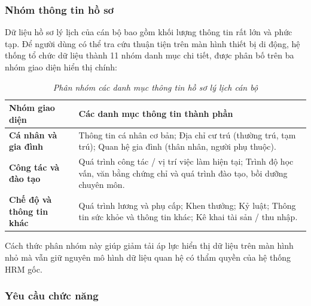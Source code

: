 \subsubsection{Nhóm thông tin hồ sơ}
Dữ liệu hồ sơ lý lịch của cán bộ bao gồm khối lượng thông tin rất lớn và phức tạp. Để người dùng có thể tra cứu thuận tiện trên màn hình thiết bị di động, hệ thống tổ chức dữ liệu thành 11 nhóm danh mục chi tiết, được phân bố trên ba nhóm giao diện hiển thị chính:

\begin{table}[H]
\centering
\renewcommand{\arraystretch}{1.25}
\begin{tabularx}{\textwidth}{|p{4.2cm}|X|}
\hline
\textbf{Nhóm giao diện} & \textbf{Các danh mục thông tin thành phần} \\
\hline
\textbf{Cá nhân và gia đình} & Thông tin cá nhân cơ bản; Địa chỉ cư trú (thường trú, tạm trú); Quan hệ gia đình (thân nhân, người phụ thuộc). \\
\hline
\textbf{Công tác và đào tạo} & Quá trình công tác / vị trí việc làm hiện tại; Trình độ học vấn, văn bằng chứng chỉ và quá trình đào tạo, bồi dưỡng chuyên môn. \\
\hline
\textbf{Chế độ và thông tin khác} & Quá trình lương và phụ cấp; Khen thưởng; Kỷ luật; Thông tin sức khỏe và thông tin khác; Kê khai tài sản / thu nhập. \\
\hline
\end{tabularx}
\caption{\textit{Phân nhóm các danh mục thông tin hồ sơ lý lịch cán bộ}}
\label{tab:profile_groups}
\end{table}

Cách thức phân nhóm này giúp giảm tải áp lực hiển thị dữ liệu trên màn hình nhỏ mà vẫn giữ nguyên mô hình dữ liệu quan hệ có thẩm quyền của hệ thống HRM gốc.

\subsubsection{Yêu cầu chức năng}

